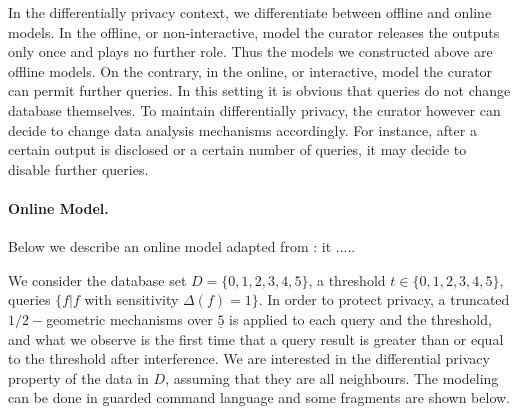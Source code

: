 In the differentially privacy context, we differentiate between offline and online models.
In the offline, or non-interactive, model the curator releases the outputs only once and plays no further role. Thus the models we constructed above are offline models. On the contrary, in the online, or interactive, model the curator can permit further queries. In this setting it is obvious that queries do not change database themselves. To maintain differentially privacy, the curator however can decide to change data analysis mechanisms accordingly. For instance, after a certain output is disclosed or a certain number of queries, it may decide to disable further queries.


\paragraph{Online Model.}
Below we describe an online model adapted from \cite{}: it ..... 

We consider the database set $D = \{0,1,2,3,4,5\}$, a threshold
$t \in \{0,1,2,3,4,5\}$, queries $\{f| f $ with sensitivity $\Delta (f) = 1 \}$. In order to protect privacy, a truncated $1/2-$geometric mechanisms over $\underline{5}$ is applied to each query and the threshold, and what we observe is the first time that a query result is greater than or equal to the threshold after interference. We are interested in the differential privacy property of the data in $D$, assuming that they are all neighbours. The modeling can be done in guarded command language and some fragments are shown below.

